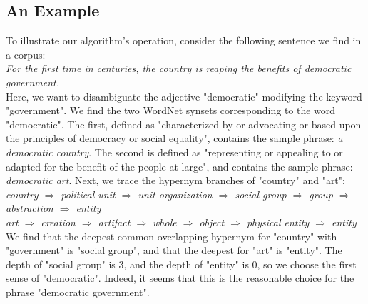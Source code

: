 \documentclass[pageno]{jpaper}
\begin{document}
\subsection{An Example}
To illustrate our algorithm's operation, consider the following sentence we find in a corpus: \\
\textit{For the first time in centuries, the country is reaping the benefits of democratic government.} \\
\indent Here, we want to disambiguate the adjective "democratic" modifying the keyword "government". We find the two WordNet synsets corresponding to the word "democratic". The first, defined as "characterized by or advocating or based upon the principles of democracy or social equality", contains the sample phrase: \textit{a democratic country}. The second is defined as "representing or appealing to or adapted for the benefit of the people at large", and contains the sample phrase: \textit{democratic art}. Next, we trace the hypernym branches of "country" and "art": \\
\textit{country $\Rightarrow$ political unit $\Rightarrow$ unit organization
 $\Rightarrow$ social group $\Rightarrow$ group $\Rightarrow$ abstraction $\Rightarrow$ entity} \\
\textit{art $\Rightarrow$ creation $\Rightarrow$ artifact $\Rightarrow$ whole $\Rightarrow$ object $\Rightarrow$
physical entity $\Rightarrow$ entity} \\
We find that the deepest common overlapping hypernym for "country" with "government" is "social group", and that the deepest for "art" is "entity". The depth of "social group" is 3, and the depth of "entity" is 0, so we choose the first sense of "democratic". Indeed, it seems that this is the reasonable choice for the phrase "democratic government".
\end{document}
